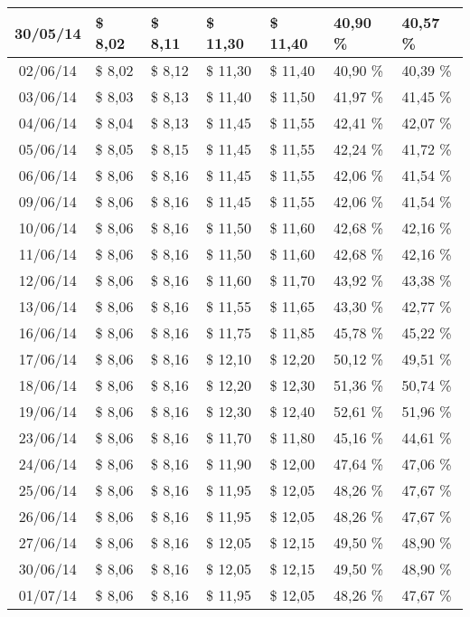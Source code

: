\begin{center}
\begin{longtable}{|c|p{1.5cm}|p{1.5cm}|p{1.5cm}|p{1.5cm}|p{1.5cm}|p{1.5cm}|}
30/05/14 & \$ 8,02 & \$ 8,11 & \$ 11,30 & \$ 11,40 & 40,90 \% & 40,57 \% \\ \hline
02/06/14 & \$ 8,02 & \$ 8,12 & \$ 11,30 & \$ 11,40 & 40,90 \% & 40,39 \% \\ \hline
03/06/14 & \$ 8,03 & \$ 8,13 & \$ 11,40 & \$ 11,50 & 41,97 \% & 41,45 \% \\ \hline
04/06/14 & \$ 8,04 & \$ 8,13 & \$ 11,45 & \$ 11,55 & 42,41 \% & 42,07 \% \\ \hline
05/06/14 & \$ 8,05 & \$ 8,15 & \$ 11,45 & \$ 11,55 & 42,24 \% & 41,72 \% \\ \hline
06/06/14 & \$ 8,06 & \$ 8,16 & \$ 11,45 & \$ 11,55 & 42,06 \% & 41,54 \% \\ \hline
09/06/14 & \$ 8,06 & \$ 8,16 & \$ 11,45 & \$ 11,55 & 42,06 \% & 41,54 \% \\ \hline
10/06/14 & \$ 8,06 & \$ 8,16 & \$ 11,50 & \$ 11,60 & 42,68 \% & 42,16 \% \\ \hline
11/06/14 & \$ 8,06 & \$ 8,16 & \$ 11,50 & \$ 11,60 & 42,68 \% & 42,16 \% \\ \hline
12/06/14 & \$ 8,06 & \$ 8,16 & \$ 11,60 & \$ 11,70 & 43,92 \% & 43,38 \% \\ \hline
13/06/14 & \$ 8,06 & \$ 8,16 & \$ 11,55 & \$ 11,65 & 43,30 \% & 42,77 \% \\ \hline
16/06/14 & \$ 8,06 & \$ 8,16 & \$ 11,75 & \$ 11,85 & 45,78 \% & 45,22 \% \\ \hline
17/06/14 & \$ 8,06 & \$ 8,16 & \$ 12,10 & \$ 12,20 & 50,12 \% & 49,51 \% \\ \hline
18/06/14 & \$ 8,06 & \$ 8,16 & \$ 12,20 & \$ 12,30 & 51,36 \% & 50,74 \% \\ \hline
19/06/14 & \$ 8,06 & \$ 8,16 & \$ 12,30 & \$ 12,40 & 52,61 \% & 51,96 \% \\ \hline
23/06/14 & \$ 8,06 & \$ 8,16 & \$ 11,70 & \$ 11,80 & 45,16 \% & 44,61 \% \\ \hline
24/06/14 & \$ 8,06 & \$ 8,16 & \$ 11,90 & \$ 12,00 & 47,64 \% & 47,06 \% \\ \hline
25/06/14 & \$ 8,06 & \$ 8,16 & \$ 11,95 & \$ 12,05 & 48,26 \% & 47,67 \% \\ \hline
26/06/14 & \$ 8,06 & \$ 8,16 & \$ 11,95 & \$ 12,05 & 48,26 \% & 47,67 \% \\ \hline
27/06/14 & \$ 8,06 & \$ 8,16 & \$ 12,05 & \$ 12,15 & 49,50 \% & 48,90 \% \\ \hline
30/06/14 & \$ 8,06 & \$ 8,16 & \$ 12,05 & \$ 12,15 & 49,50 \% & 48,90 \% \\ \hline
01/07/14 & \$ 8,06 & \$ 8,16 & \$ 11,95 & \$ 12,05 & 48,26 \% & 47,67 \% \\ \hline

\end{longtable}
\end{center}
